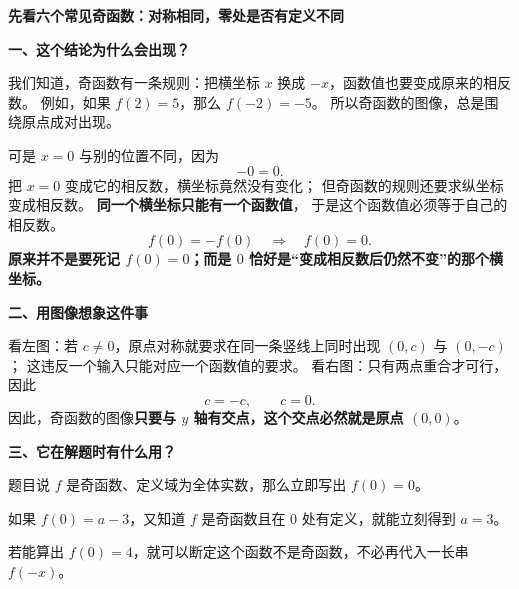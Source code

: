 \clearpage
\begin{explanationbox}
\textbf{\textcolor{CExplanation}{先看六个常见奇函数：对称相同，零处是否有定义不同}}





\end{explanationbox}
\clearpage
\begin{explanationbox}
  \textbf{\textcolor{CExplanation}{一、这个结论为什么会出现？}}

  我们知道，奇函数有一条规则：把横坐标 $x$ 换成 $-x$，函数值也要变成原来的相反数。
  例如，如果 $f(2)=5$，那么 $f(-2)=-5$。
  所以奇函数的图像，总是围绕原点成对出现。

  可是 $x=0$ 与别的位置不同，因为
  \[
    -0=0.
  \]
  把 $x=0$ 变成它的相反数，横坐标竟然没有变化；
  但奇函数的规则还要求纵坐标变成相反数。
  \textbf{同一个横坐标只能有一个函数值}，
  于是这个函数值必须等于自己的相反数。
  \[
    f(0)=-f(0)\quad\Longrightarrow\quad f(0)=0.
  \]
  \textbf{原来并不是要死记 $f(0)=0$；而是 $0$ 恰好是“变成相反数后仍然不变”的那个横坐标。}

  \medskip
  \textbf{\textcolor{CExplanation}{二、用图像想象这件事}}



  看左图：若 $c\ne0$，原点对称就要求在同一条竖线上同时出现 $(0,c)$ 与 $(0,-c)$；
  这违反一个输入只能对应一个函数值的要求。
  看右图：只有两点重合才可行，因此
  \[
    c=-c,\qquad c=0.
  \]
  因此，奇函数的图像\textbf{只要与 $y$ 轴有交点，这个交点必然就是原点 $(0,0)$}。

  \medskip
  
\end{explanationbox}
\clearpage
\begin{explanationbox}
\textbf{\textcolor{CExplanation}{三、它在解题时有什么用？}}


  \begin{description}[style=nextline, leftmargin=2.8em, labelsep=0.5em, itemsep=0.45em]
    \item[\textbf{用途一：不求完整表达式，直接求值。}]
      题目说 $f$ 是奇函数、定义域为全体实数，那么立即写出 $f(0)=0$。
    \item[\textbf{用途二：求未知参数。}]
      如果 $f(0)=a-3$，又知道 $f$ 是奇函数且在 $0$ 处有定义，就能立刻得到 $a=3$。
    \item[\textbf{用途三：快速排除。}]
      若能算出 $f(0)=4$，就可以断定这个函数不是奇函数，不必再代入一长串 $f(-x)$。
  \end{description}

  \medskip
  
\end{explanationbox}
